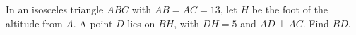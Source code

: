 In an isosceles triangle $ABC$ with $AB=AC=13$, let $H$ be the foot of the altitude from $A$. A point $D$ lies on $BH$, with $DH=5$ and $AD\perp AC$. Find $BD$.
